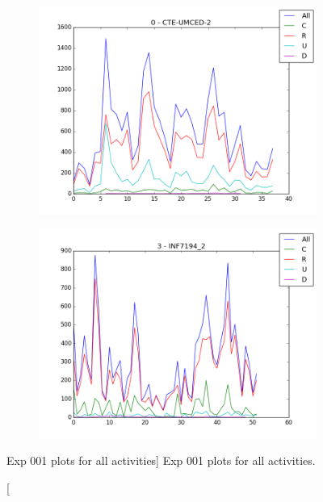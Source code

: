 \begin{figure}[h!]
    \centering

    \begin{subfigure}{.5\textwidth}
        \centering
        \includegraphics[width=\linewidth]{imgs/fig_0_CTE-UMCED-2_all}
        \label{subfig:exp_001_0_all}
    \end{subfigure}%
    \begin{subfigure}{.5\textwidth}
        \centering
        \includegraphics[width=\linewidth]{imgs/fig_3_INF7194_2_all}
        \label{subfig:exp_001_3_all}
    \end{subfigure}

    \caption
        [Exp 001 plots for all activities]
        {Exp 001 plots for all activities.}

    \label{fig:exp_001_all}
\end{figure}

